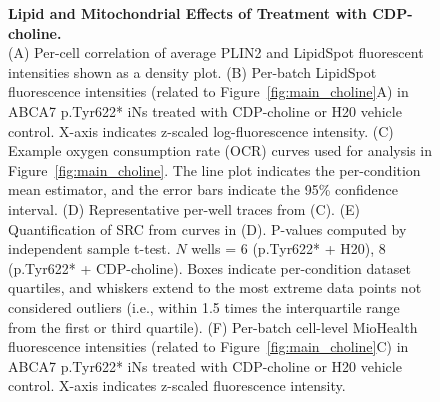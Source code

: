 \begin{figure}[ht]
    \centering
    \caption{
        \textbf{Lipid and Mitochondrial Effects of Treatment with CDP-choline.}\\[1ex]
        (A) Per-cell correlation of average PLIN2 and LipidSpot fluorescent intensities shown as a density plot. 
        (B) Per-batch LipidSpot fluorescence intensities (related to Figure~\ref{fig:main_choline}A) in ABCA7 p.Tyr622* iNs treated with CDP-choline or H20 vehicle control. X-axis indicates z-scaled log-fluorescence intensity. 
        (C) Example oxygen consumption rate (OCR) curves used for analysis in Figure~\ref{fig:main_choline}. The line plot indicates the per-condition mean estimator, and the error bars indicate the 95\% confidence interval. 
        (D) Representative per-well traces from (C). 
        (E) Quantification of SRC from curves in (D). P-values computed by independent sample t-test. $N$ wells = 6 (p.Tyr622* + H20), 8 (p.Tyr622* + CDP-choline). Boxes indicate per-condition dataset quartiles, and whiskers extend to the most extreme data points not considered outliers (i.e., within 1.5 times the interquartile range from the first or third quartile). 
        (F) Per-batch cell-level MioHealth fluorescence intensities (related to Figure~\ref{fig:main_choline}C) in ABCA7 p.Tyr622* iNs treated with CDP-choline or H20 vehicle control. X-axis indicates z-scaled fluorescence intensity.
    }
    \label{fig:lipid_mitochondrial_effects_CDP_choline}
\end{figure}
